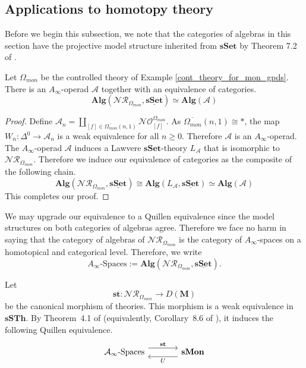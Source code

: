 \documentclass{tac}
\begin{document}
\subsection*{Applications to homotopy theory}
Before we begin this subsection, we note that the categories of algebras in this section have the projective model structure inherited from $\mathbf{sSet}$ by Theorem 7.2 of \cite{Rezk2002}. 
\begin{proposition}\label{equiv_to_A_inf_op}
Let $\Omega_{mon}$ be the controlled theory of Example \ref{cont_theory_for_mon_gpds}. There is an $A_\infty$-operad $\mathcal{A}$ together with an equivalence of categories.
\[
\mathbf{Alg}(\mathcal{NR}_{\Omega_{mon}},\underline{\mathbf{sSet}})\simeq \mathbf{Alg}(\mathcal{A})
\]
\end{proposition}
\begin{proof}
Define $\mathcal{A}_{n}=\coprod_{[f]\in \overline{\Omega_{mon}}(n,1)}\mathcal{N}\mathcal{O}^{\Omega_{mon}}_{[f]}$. As $\overline{\Omega_{mon}}(n,1) \cong *$, the map $W_{n}:\Delta^0\to\mathcal{A}_{n}$ is a weak equivalence for all $n\geq 0$. Therefore $\mathcal{A}$ is an $A_{\infty}$-operad. The $A_{\infty}$-operad $\mathcal{A}$ induces a Lawvere $\mathbf{sSet}$-theory $L_{\mathcal{A}}$ that is isomorphic to $\mathcal{NR}_{\Omega_{mon}}$. Therefore we induce our equivalence of categories as the composite of the following chain.
\[
\mathbf{Alg}(\mathcal{NR}_{\Omega_{mon}},\underline{\mathbf{sSet}})\cong \mathbf{Alg}(L_{\mathcal{A}},\underline{\mathbf{sSet}})\simeq\mathbf{Alg}(\mathcal{A})
\]
This completes our proof.
\end{proof}

We may upgrade our equivalence to a Quillen equivalence since the model structures on both categories of algebras agree. Therefore we face no harm in saying that the category of algebras of $\mathcal{NR}_{\Omega_{mon}}$ is the category of $A_\infty$-spaces on a homotopical and categorical level. Therefore, we write 
\[
A_\infty\text{-Spaces}:=\mathbf{Alg}(\mathcal{NR}_{\Omega_{mon}},\underline{\mathbf{sSet}}).
\]

Let
\[
\mathbf{st}:\mathcal{NR}_{\Omega_{mon}}\longrightarrow D(\mathbf{M})
\]
be the canonical morphism of theories. This morphism is a weak equivalence in
$\mathbf{sSTh}$. By Theorem~4.1 of \cite{BergerMoerdijk2007} (equivalently,
Corollary~8.6 of \cite{Rezk2002}), it induces the following Quillen equivalence.
\[
\begin{tikzcd}[column sep=large]
\mathcal{A}_{\infty}\text{-Spaces}
\arrow[r, shift left=1.2ex, "\mathbf{st}"]
&
\mathbf{sMon}
\arrow[l, shift left=1.2ex, "U"]
\end{tikzcd}
\]
\end{document}
